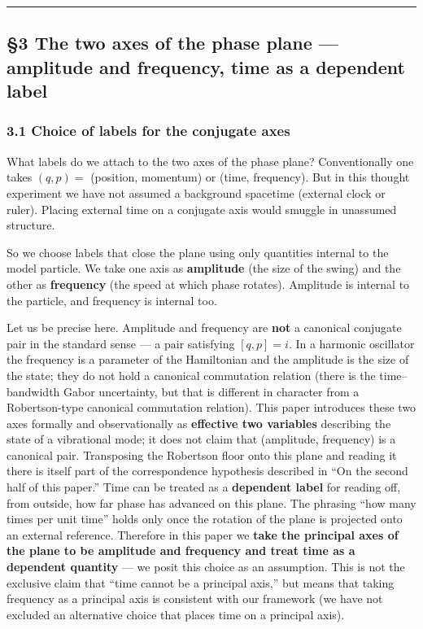 \documentclass[
]{article}
\begin{document}
\begin{center}\rule{0.5\linewidth}{0.5pt}\end{center}

\subsection{§3 The two axes of the phase plane --- amplitude and
frequency, time as a dependent
label}\label{the-two-axes-of-the-phase-plane-amplitude-and-frequency-time-as-a-dependent-label}

\subsubsection{3.1 Choice of labels for the conjugate
axes}\label{choice-of-labels-for-the-conjugate-axes}

What labels do we attach to the two axes of the phase plane?
Conventionally one takes \((q,p)=\) (position, momentum) or (time,
frequency). But in this thought experiment we have not assumed a
background spacetime (external clock or ruler). Placing external time on
a conjugate axis would smuggle in unassumed structure.

So we choose labels that close the plane using only quantities internal
to the model particle. We take one axis as \textbf{amplitude} (the size
of the swing) and the other as \textbf{frequency} (the speed at which
phase rotates). Amplitude is internal to the particle, and frequency is
internal too.

Let us be precise here. Amplitude and frequency are \textbf{not} a
canonical conjugate pair in the standard sense --- a pair satisfying
\([q,p]=i\). In a harmonic oscillator the frequency is a parameter of
the Hamiltonian and the amplitude is the size of the state; they do not
hold a canonical commutation relation (there is the time--bandwidth
Gabor uncertainty, but that is different in character from a
Robertson-type canonical commutation relation). This paper introduces
these two axes formally and observationally as \textbf{effective two
variables} describing the state of a vibrational mode; it does not claim
that (amplitude, frequency) is a canonical pair. Transposing the
Robertson floor onto this plane and reading it there is itself part of
the correspondence hypothesis described in ``On the second half of this
paper.'' Time can be treated as a \textbf{dependent label} for reading
off, from outside, how far phase has advanced on this plane. The
phrasing ``how many times per unit time'' holds only once the rotation
of the plane is projected onto an external reference. Therefore in this
paper we \textbf{take the principal axes of the plane to be amplitude
and frequency and treat time as a dependent quantity} --- we posit this
choice as an assumption. This is not the exclusive claim that ``time
cannot be a principal axis,'' but means that taking frequency as a
principal axis is consistent with our framework (we have not excluded an
alternative choice that places time on a principal axis).
\end{document}
